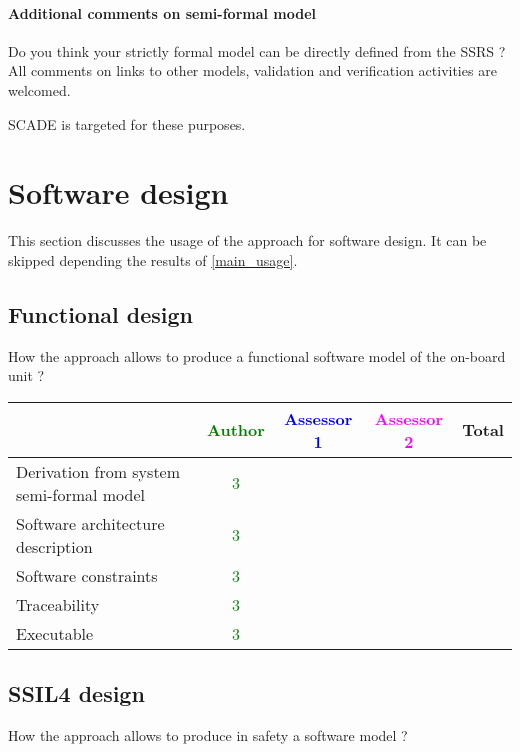 \paragraph{Additional comments on semi-formal  model} Do you think your strictly formal  model can be directly defined from the SSRS ?
All comments on links to  other models, validation and verification activities are welcomed.

\begin{author_comment}
SCADE is targeted for these purposes.   
\end{author_comment}



\section{Software design}
This section discusses the usage of the approach for software design.
It can be skipped depending the results of \ref{main_usage}.

\subsection{Functional design}

How the approach allows to  produce a functional software model of the on-board unit ?

\begin{tabular}{|l | c | c | c | c|}
\hline
& \textcolor{green}{Author} & \textcolor{blue}{Assessor 1} & \textcolor{magenta}{Assessor 2} & Total \\
\hline
Derivation from system semi-formal model  & \textcolor{green}{3} & & &  \\
\hline 
Software architecture description  & \textcolor{green}{3} & & &  \\
\hline
Software constraints  & \textcolor{green}{3} & & &  \\
\hline
Traceability  & \textcolor{green}{3} & & &  \\
\hline
Executable  & \textcolor{green}{3} & & &  \\
\hline
\end{tabular}

\subsection{SSIL4 design}

How the approach allows to  produce in safety a software model ?

